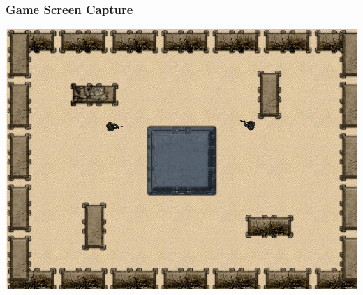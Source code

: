 \documentclass{beamer}
\begin{document}
\begin{frame}
\frametitle{Game Screen Capture}
\includegraphics[scale=0.3]{images/gamescreenshot.png}
\end{frame}
\end{document}
